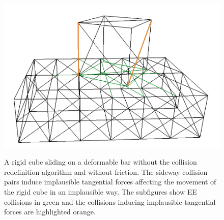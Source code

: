 \begin{figure}[tbp]
\begin{minipage}[b]{0.3 \linewidth}
{	       \includegraphics[width=1.0\linewidth]{pics/png/redef_ee06wo.png} }
		\end{minipage}
				\caption[A rigid cube sliding on a deformable bar without the collision redefinition algorithm and without friction.]{A rigid cube sliding on a deformable bar without the collision redefinition algorithm and without friction. The sideway collision pairs induce implausible tangential forces affecting the movement of the rigid cube in an implausible way. The subfigures show EE collisions in green and the collisions inducing implausible tangential forces are highlighted orange.}
				\label{fig::redef_collsEEwo}
\end{figure}

